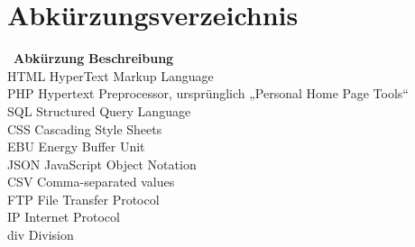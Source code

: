 
\chapter*{Abkürzungsverzeichnis}\thispagestyle{fancy}

\begin{tabbing}
\ \= \textbf{Abkürzung} \hspace{0.5cm} \= \textbf{Beschreibung} \kill
\\
\> HTML \>  HyperText Markup Language \\
\> PHP \>   Hypertext Preprocessor, ursprünglich „Personal Home Page Tools“\\
\> SQL \>   Structured Query Language\\
\> CSS \>   Cascading Style Sheets\\
\> EBU \>   Energy Buffer Unit\\
\> JSON \>   JavaScript Object Notation\\
\> CSV \>   Comma-separated values\\
\> FTP \>   File Transfer Protocol\\
\> IP \>   Internet Protocol\\
\> div \>   Division\\


\end{tabbing}

